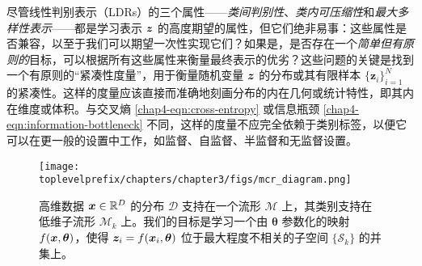 \documentclass[../../book-main_zh.tex]{subfiles}
\begin{document}
尽管线性判别表示（LDRs）的三个属性——{\em 类间判别性}、{\em 类内可压缩性}和{\em 最大多样性表示}——都是学习表示 $\bm{z}$ 的高度期望的属性，但它们绝非易事：这些属性是否兼容，以至于我们可以期望一次性实现它们？如果是，是否存在一个{\em 简单但有原则的}目标，可以根据所有这些属性来衡量最终表示的优劣？这些问题的关键是{找到}一个有原则的“紧凑性度量”，用于衡量随机变量 $\bm{z}$ 的分布或其有限样本 $\{\bm z_i\}_{i=1}^N$ 的紧凑性。这样的度量应该直接而准确地刻画分布的内在几何或统计特性，即其内在维度或{体积}。与交叉熵 \eqref{chap4-eqn:cross-entropy} 或信息瓶颈 \eqref{chap4-eqn:information-bottleneck} 不同，这样的度量不应完全依赖于类别标签，以便它可以在更一般的设置中工作，如监督、自监督、半监督和无监督设置。

\begin{figure}
	\centering
	\texttt{[image: \\toplevelprefix/chapters/chapter3/figs/mcr\_diagram.png]}
	\caption{高维数据 $\bm{x}\in \mathbb{R}^D$ 的分布 $\mathcal D$ 支持在一个流形 $\mathcal{M}$ 上，其类别支持在低维子流形 $\mathcal{M}_k$ 上。我们的目标是学习一个由 $\bm \theta$ 参数化的映射 $f(\bm{x}, \bm  \theta)$，使得 $\bm{z}_i = f(\bm{x}_i, \bm \theta)$ 位于最大程度不相关的子空间 $\{\mathcal{S}_k\}$ 的并集上。}
	\label{chap4-fig:mcr-diagram}
\end{figure}
\end{document}
